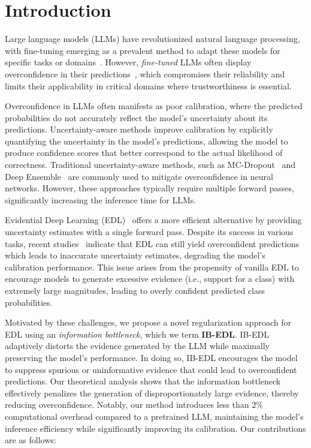 \section{Introduction}

Large language models (LLMs) have revolutionized natural language processing, with fine-tuning emerging as a prevalent method to adapt these models for specific tasks or domains~\citep{houlsby2019parameter,hu2022lora}. However, \emph{fine-tuned} LLMs often display overconfidence in their predictions~\citep{jiang2021can,yang2024lalora}, which compromises their reliability and limits their applicability in critical domains where trustworthiness is essential.

Overconfidence in LLMs often manifests as poor calibration, where the predicted probabilities do not accurately reflect the model's uncertainty about its predictions. Uncertainty-aware methods improve calibration by explicitly quantifying the uncertainty in the model's predictions, allowing the model to produce confidence scores that better correspond to the actual likelihood of correctness. Traditional uncertainty-aware methods, such as MC-Dropout~\citep{gal2016dropout} and Deep Ensemble~\citep{lakshminarayanan2017simple,fort2019deep} are commonly used to mitigate overconfidence in neural networks. However, these approaches typically require multiple forward passes, significantly increasing the inference time for LLMs.

Evidential Deep Learning (EDL)~\citep{sensoy2018evidential,malinin2018predictive} offers a more efficient alternative by providing uncertainty estimates with a single forward pass. Despite its success in various tasks, recent studies~\citep{deng2023uncertainty,chen2024redl} indicate that EDL can still yield overconfident predictions which leads to inaccurate uncertainty estimates, degrading the model’s calibration performance. This issue arises from the propensity of vanilla EDL to encourage models to generate excessive evidence (i.e., support for a class) with extremely large magnitudes, leading to overly confident predicted class probabilities.


Motivated by these challenges, we propose a novel regularization approach for EDL using an \emph{information bottleneck}, which we term \textbf{IB-EDL}. IB-EDL adaptively distorts the evidence generated by the LLM while maximally preserving the model's performance. In doing so, IB-EDL encourages the model to suppress spurious or uninformative evidence that could lead to overconfident predictions. Our theoretical analysis shows that the information bottleneck effectively penalizes the generation of disproportionately large evidence, thereby reducing overconfidence. Notably, our method introduces less than $2\%$ computational overhead compared to a pretrained LLM, maintaining the model's inference efficiency while significantly improving its calibration. Our contributions are as follows:

